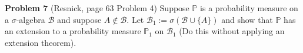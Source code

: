 \documentclass{article}
\begin{document}
\vspace{3 mm}


\noindent \textbf{Problem 7} (Resnick, page 63 Problem 4) Suppose $\mathbb{P}$ is a probability measure on a $\sigma$-algebra $\mathcal{B}$ and suppose $A \notin \mathcal{B}$.  Let $\mathcal{B}_{1} := \sigma(\mathcal{B} \cup \{A\})$ and show that $\mathbb{P}$ has an extension to a probability measure $\mathbb{P}_{1}$ on $\mathcal{B}_{1}$ (Do this without applying an extension theorem).
\end{document}

